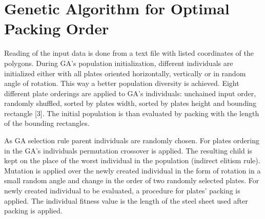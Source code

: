 \documentclass{llncs}
\begin{document}
\section{Genetic Algorithm for Optimal Packing Order}
%
Reading of the input data is done from a text file with listed coordinates of the polygons. During GA's population initialization, different individuals are initialized either with all plates oriented horizontally, vertically or in random angle of rotation. This way a better population diversity is achieved. Eight different plate orderings are applied to GA's individuals: unchained input order, randomly shuffled, sorted by plates width, sorted by plates height and bounding rectangle [3]. The initial population is than evaluated by packing with the length of the bounding rectangles. 

As GA selection rule parent individuals are randomly chosen. For plates ordering in the GA's individuals permutation crossover is applied. The resulting child is kept on the place of the worst individual in the population (indirect elitism rule). Mutation is applied over the newly created individual in the form of rotation in a small random angle and change in the order of two randomly selected plates. For newly created individual to be evaluated, a procedure for plates' packing is applied. The individual fitness value is the length of the steel sheet used after packing is applied. 
%
\end{document}

